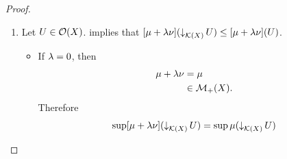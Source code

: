 \documentclass{book}
\begin{document}
\begin{proof}
\begin{enumerate}
\begin{itemize}
				\begin{align*}
					[\mu + \lam \nu](U)
					& = \mu(U) + \lam \nu(U) \\
					& \leq \mu(U_{\mu}) + \lam \nu(U_{\nu}) \\
					& < \bigg[ \mu(E) + \frac{\ep}{2} \bigg] + \lam \bigg[ \nu(E) + \frac{\ep}{2(\lam + 1)} \bigg] \\
					& = \mu(E) + \frac{\ep}{2} + \lam \nu(E) + \frac{\ep \lam }{2 (\lam + 1)} \\
					& < \mu(E) + \frac{\ep}{2} + \lam \nu(E) + \frac{\ep}{2} \\ 
					& = \mu(E) + \lam \nu(E) + \ep 
				\end{align*}
				Since $\ep > 0$ is arbitrary, we have that for each $\ep > 0$,
				\begin{align*}
					\inf [\mu + \lam \nu](\upar_{\MO(X)} E)
					& \leq [\mu + \lam \nu](U) \\
					& < \mu(E) + \lam \nu(E) + \ep.
				\end{align*}
				Hence 
				\begin{align*}
					\inf [\mu + \lam \nu](\upar_{\MO(X)} E)
					& \leq \mu(E) + \lam \nu(E) \\
					& = [\mu + \lam \nu](E).
				\end{align*}
				Therefore
				\begin{align*}
					\inf [\mu + \lam \nu](\upar_{\MO(X)} E)
					& \leq [\mu + \lam \nu](E) \\
					& \leq \inf [\mu + \lam \nu](\upar_{\MO(X)} E)
				\end{align*}
				and $[\mu + \lam \nu](E) = \inf [\mu + \lam \nu](\upar_{\MO(X)} E)$ and $\mu + \lam \nu$ is outer regular on $E$. Since $E \in \MB(X)$ is arbitrary, we have that for each $E \in \MB(X)$, $\mu + \lam \nu$ is outer regular on $E$. 
			\end{itemize}
			\item Let $U \in \mathcal{O}(X)$.  implies that $[\mu + \lambda \nu](\operatorname{\downarrow}_{\mathcal{K}(X)} U) \leq [\mu + \lambda \nu](U)$. 
			\begin{itemize}
				\item If $\lambda = 0$, then  
				\begin{align*}
					\mu + \lambda \nu 
					& = \mu \\
					& \in \mathcal{M}_+(X).
				\end{align*}
				Therefore
				\begin{align*}
					\sup [\mu + \lam \nu] (\doar_{\MK(X)} U) 
					& = \sup \mu(\doar_{\MK(X)} U)  \\

\end{align*}
\end{itemize}
\end{enumerate}
\end{proof}
\end{document}
